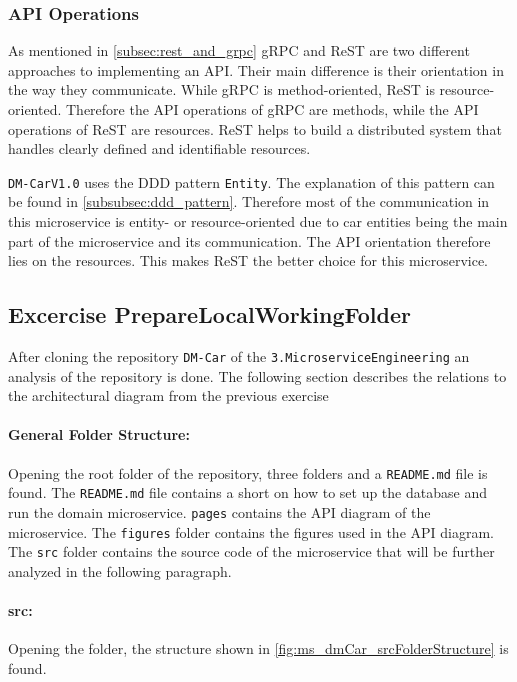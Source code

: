 \subsubsection*{API Operations}
As mentioned in \autoref{subsec:rest_and_grpc} gRPC and ReST are two different approaches to implementing an API.
Their main difference is their orientation in the way they communicate.
While gRPC is method-oriented, ReST is resource-oriented.
Therefore the API operations of gRPC are methods, while the API operations of ReST are resources.
ReST helps to build a distributed system that handles clearly defined and identifiable resources.

\texttt{DM-CarV1.0} uses the DDD pattern \texttt{Entity}.
The explanation of this pattern can be found in \autoref{subsubsec:ddd_pattern}.
Therefore most of the communication in this microservice is entity- or resource-oriented due to car entities being the main part of the microservice and its communication.
The API orientation therefore lies on the resources.
This makes ReST the better choice for this microservice.

\subsection{Excercise PrepareLocalWorkingFolder}
\label{subsec:prepare_local_working_folder}
After cloning the repository \texttt{DM-Car} of the \texttt{3.MicroserviceEngineering} an analysis of the repository is done.
The following section describes the relations to the architectural diagram from the previous exercise 

\paragraph*{General Folder Structure:}
Opening the root folder of the repository, three folders and a \texttt{README.md} file is found.
The \texttt{README.md} file contains a short on how to set up the database and run the domain microservice.
\texttt{pages} contains the API diagram of the microservice.
The \texttt{figures} folder contains the figures used in the API diagram. 
The \texttt{src} folder contains the source code of the microservice that will be further analyzed in the following paragraph.

\paragraph*{src:}
Opening the folder, the structure shown in \autoref{fig:ms_dmCar_srcFolderStructure} is found.

